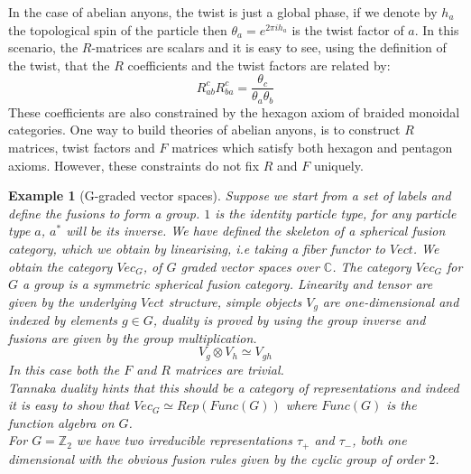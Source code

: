 \documentclass{article}
\newtheorem{example}{Example}
\begin{document}
In the case of abelian anyons, the twist is just a global phase, if we denote by $h_a$ the topological spin of the particle then $\theta_a = e^{2\pi i h_a}$ is the twist factor of $a$. In this scenario, the $R$-matrices are scalars and it is easy to see, using the definition of the twist, that the $R$ coefficients and the twist factors are related by:
$$R_{ab}^c R_{ba}^c = \frac{\theta_c}{\theta_a \theta_b}$$
These coefficients are also constrained by the hexagon axiom of braided monoidal categories. One way to build theories of abelian anyons, is to construct $R$ matrices, twist factors and $F$ matrices which satisfy both hexagon and pentagon axioms. However, these constraints do not fix $R$ and $F$ uniquely. 
\begin{example}[G-graded vector spaces]
	Suppose we start from a set of labels and define the fusions to form a group. $1$ is the identity particle type, for any particle type $a$, $a^*$ will be its inverse. We have defined the skeleton of a spherical fusion category, which we obtain by linearising, i.e taking a fiber functor to $Vect$. We obtain the category $Vec_G$, of $G$ graded vector spaces over $\mathbb{C}$.
	The category $Vec_G$ for $G$ a group is a symmetric spherical fusion category. Linearity and tensor are given by the underlying $Vect$ structure, simple objects $V_g$ are one-dimensional and indexed by elements $g \in G$, duality is proved by using the group inverse and fusions are given by the group multiplication.
	$$V_g \otimes V_h \simeq V_{gh}$$
	In this case both the $F$ and $R$ matrices are trivial.\\
	Tannaka duality hints that this should be a category of representations and indeed it is easy to show that $Vec_G \simeq Rep(Func(G))$ where $Func(G)$ is the function algebra on $G$.\\
	For $G=\mathbb{Z}_2$ we have two irreducible representations $\tau_+$ and $\tau_-$, both one dimensional with the obvious fusion rules given by the cyclic group of order $2$.\\
\end{example}
\end{document}
